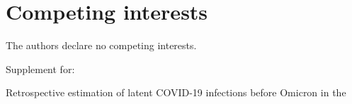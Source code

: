 \documentclass{article}
\begin{document}
\section*{Competing interests}

The authors declare no competing interests.

\clearpage
\appendix
\begin{center}
\Huge{Supplement for:}
\vspace*{11pt}


\Large{Retrospective estimation of latent COVID-19 infections before Omicron in the \US}
\end{center}

\vspace{11pt}


\end{document}
